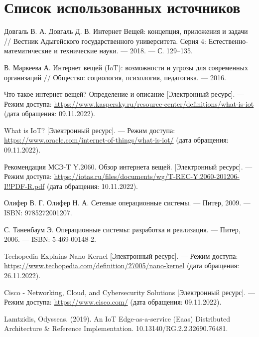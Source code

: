 \section*{Список использованных источников}

\begingroup
\renewcommand{\section}[2]{}
\begin{thebibliography}{}
	Довгаль В. А. Довгаль Д. В. Интернет Вещей: концепция, приложения и задачи // Вестник Адыгейского государственного университета. Серия 4: Естественно-математические и технические науки. —
	2018. — С. 129–135.
	
	В. Маркеева А. Интернет вещей (IoT): возможности и угрозы
	для современных организаций // Общество: социология, психология,
	педагогика. — 2016.
	
	Что такое интернет вещей? Определение и описание [Электронный ресурс]. — Режим доступа: \url{https://www.kaspersky.ru/resource-center/definitions/what-is-iot} (дата обращения: 09.11.2022).
	
	What is IoT? [Электронный ресурс]. — Режим доступа: \url{https://www.oracle.com/internet-of-things/what-is-iot/} (дата обращения:
	09.11.2022).
	
	Рекомендация МСЭ-T Y.2060. Обзор интернета вещей.
	[Электронный ресурс]. — Режим доступа: \url{https://iotas.ru/files/documents/wg/T-REC-Y.2060-201206-I!!PDF-R.pdf} (дата обращения:
	10.11.2022).
	
	Олифер В. Г. Олифер Н. А. Сетевые операционные системы. —
	Питер, 2009. — ISBN: 9785272001207.
	
	С. Таненбаум Э. Операционные системы: разработка и реализация. — Питер, 2006. — ISBN: 5-469-00148-2.
	
	Techopedia Explains Nano Kernel [Электронный ресурс]. — Режим доступа: \url{https://www.techopedia.com/definition/27005/nano-kernel} (дата обращения: 26.11.2022).
	
	Cisco - Networking, Cloud, and Cybersecurity Solutions [Электронный ресурс]. — Режим доступа: \url{https://www.cisco.com/} (дата обращения: 09.11.2022).
	
	Lamtzidis, Odysseas. (2019). An IoT Edge-as-a-service (Eaas) Distributed Architecture \& Reference Implementation. 10.13140/RG.2.2.32690.76481. 
	

\end{thebibliography}

